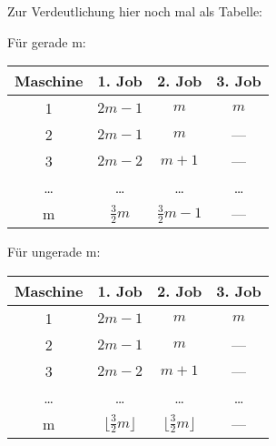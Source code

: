\documentclass[a4paper]{article}
\begin{document}
	Zur Verdeutlichung hier noch mal als Tabelle:
	\begin{multicols}{2}
	Für gerade m: \n
\begin{tabular}{|c||c|c|c|} \hline
Maschine	&	1. Job 	&	2. Job	&	3. Job	\\ \hline \hline
1			&	$2m-1$	&	$m$		&	$m$		\\ \hline
2			&	$2m-1$	&	$m$		&	---		\\ \hline
3			&	$2m-2$	&	$m+1$	&	---		\\ \hline
\dots		&	\dots	&	\dots	&	\dots	\\ \hline
m			&	$\frac{3}{2}m$ 	&	$\frac{3}{2}m-1$ 	&	---	\\ \hline
\end{tabular}

Für ungerade m: \n
	\begin{tabular}{|c||c|c|c|} \hline
Maschine	&	1. Job 	&	2. Job	&	3. Job	\\ \hline \hline
1			&	$2m-1$	&	$m$		&	$m$		\\ \hline
2			&	$2m-1$	&	$m$		&	---		\\ \hline
3			&	$2m-2$	&	$m+1$	&	---		\\ \hline
\dots		&	\dots	&	\dots	&	\dots	\\ \hline
m			&	$\lfloor \frac{3}{2}m \rfloor$	&	$\lfloor \frac{3}{2}m \rfloor$	&	---	\\ \hline
\end{tabular}
	\end{multicols}
\end{document}
